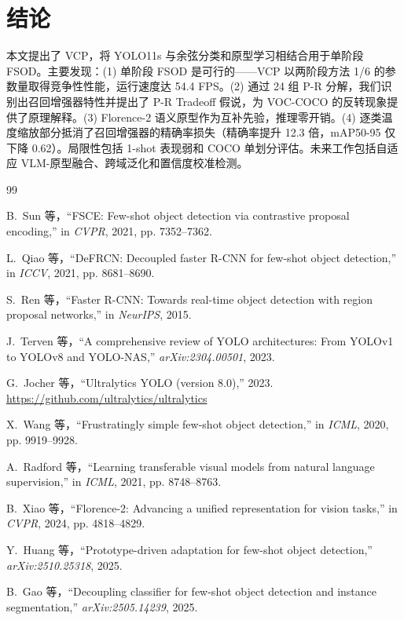\documentclass[conference]{IEEEtran}
\begin{document}
\section{结论}

本文提出了 VCP，将 YOLO11s 与余弦分类和原型学习相结合用于单阶段 FSOD。主要发现：(1) 单阶段 FSOD 是可行的——VCP 以两阶段方法 1/6 的参数量取得竞争性性能，运行速度达 54.4 FPS。(2) 通过 24 组 P-R 分解，我们识别出召回增强器特性并提出了 P-R Tradeoff 假说，为 VOC-COCO 的反转现象提供了原理解释。(3) Florence-2 语义原型作为互补先验，推理零开销。(4) 逐类温度缩放部分抵消了召回增强器的精确率损失（精确率提升 12.3 倍，mAP50-95 仅下降 0.62）。局限性包括 1-shot 表现弱和 COCO 单划分评估。未来工作包括自适应 VLM-原型融合、跨域泛化和置信度校准检测。

\begin{thebibliography}{99}

B.~Sun 等，``FSCE: Few-shot object detection via contrastive proposal encoding,'' in \emph{CVPR}, 2021, pp. 7352--7362.

L.~Qiao 等，``DeFRCN: Decoupled faster R-CNN for few-shot object detection,'' in \emph{ICCV}, 2021, pp. 8681--8690.

S.~Ren 等，``Faster R-CNN: Towards real-time object detection with region proposal networks,'' in \emph{NeurIPS}, 2015.

J.~Terven 等，``A comprehensive review of YOLO architectures: From YOLOv1 to YOLOv8 and YOLO-NAS,'' \emph{arXiv:2304.00501}, 2023.

G.~Jocher 等，``Ultralytics YOLO (version 8.0),'' 2023. \url{https://github.com/ultralytics/ultralytics}

X.~Wang 等，``Frustratingly simple few-shot object detection,'' in \emph{ICML}, 2020, pp. 9919--9928.

A.~Radford 等，``Learning transferable visual models from natural language supervision,'' in \emph{ICML}, 2021, pp. 8748--8763.

B.~Xiao 等，``Florence-2: Advancing a unified representation for vision tasks,'' in \emph{CVPR}, 2024, pp. 4818--4829.

Y.~Huang 等，``Prototype-driven adaptation for few-shot object detection,'' \emph{arXiv:2510.25318}, 2025.

B.~Gao 等，``Decoupling classifier for few-shot object detection and instance segmentation,'' \emph{arXiv:2505.14239}, 2025.


\end{thebibliography}
\end{document}
